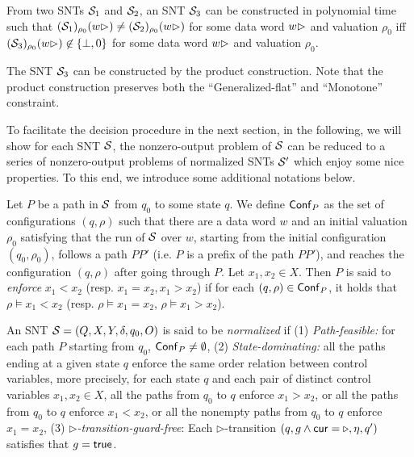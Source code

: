 \begin{proposition}\label{prop-snt-eqv-to-nzero}
From two SNTs ${\mathcal{S} }_1$ and ${\mathcal{S} }_2$, an SNT ${\mathcal{S} }_3$ can be constructed in polynomial time such that  $({\mathcal{S} }_1)_{\rho_0}(w\rhd) \neq ({\mathcal{S} }_2)_{\rho_0}(w\rhd)$ for some  data word $w \rhd$ and valuation $\rho_0$  iff $({\mathcal{S} }_3)_{\rho_0}(w\rhd) \not\in \{\bot,0\}$ for some data word $w\rhd$ and valuation $\rho_0$.
\end{proposition}
The SNT ${\mathcal{S} }_3$ can be constructed by the product construction. Note that the product construction preserves both the ``Generalized-flat'' and ``Monotone'' constraint. 

To facilitate the decision procedure in the next section, in the following, we will show for each SNT ${\mathcal{S} }$, the nonzero-output problem of ${\mathcal{S} }$ can be reduced to a series of nonzero-output problems of normalized SNTs ${\mathcal{S} }'$ which enjoy some nice properties. To this end, we introduce some additional notations below.


Let $P$ be a path in ${\mathcal{S} }$ from $q_0$ to some state $q$. We define ${\sf Conf}_P$ as the set of configurations $(q, \rho)$ such that there are a data word $w$ and an initial valuation $\rho_0$ satisfying that the run of ${\mathcal{S} }$ over $w$, starting from the initial configuration $(q_0, \rho_0)$, follows a path $P P'$ (i.e. $P$ is a prefix of the path $PP'$), and reaches the configuration $(q,\rho)$ after going through $P$. Let $x_1, x_2 \in X$. Then $P$ is said to \emph{enforce} $x_1 < x_2$ (resp. $x_1 = x_2, x_1 > x_2$) if for each $(q,\rho) \in {\sf Conf}_P$, it holds that $\rho \models x_1 < x_2$ (resp. $\rho \models x_1 = x_2$, $\rho \models x_1 > x_2$). 

An SNT ${\mathcal{S} }=(Q, X, Y, \delta, q_0, O)$ is said to be \emph{normalized} if (1) {\it Path-feasible:} for each path $P$ starting from $q_0$, ${\sf Conf}_P \neq \emptyset$, (2) {\it State-dominating:} all the paths ending at a given state $q$ enforce the same order relation between control variables, more precisely, for each state $q$ and each pair of distinct control variables $x_1, x_2 \in X$, all the paths  from $q_0$ to $q$ enforce $x_1 > x_2$, or all the paths from $q_0$ to $q$ enforce $x_1 < x_2$, or all the nonempty paths from $q_0$ to $q$ enforce $x_1 = x_2$, (3) {\it $\triangleright$-transition-guard-free}: Each $\triangleright$-transition $(q, g \wedge \mathsf{cur} = \triangleright, \eta, q')$ satisfies that $g = \mathsf{true}$.
%
%
%
%

